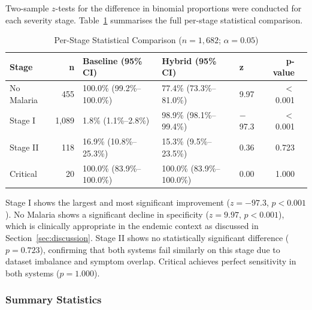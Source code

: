 \documentclass[12pt,a4paper]{article}
\begin{document}
Two-sample $z$-tests for the difference in binomial proportions were conducted for each severity stage. Table~\ref{tab:statstable} summarises the full per-stage statistical comparison.

\begin{table}[H]
\centering
\caption{Per-Stage Statistical Comparison ($n = 1{,}682$; $\alpha = 0.05$)}
\label{tab:statstable}
\begin{tabular}{@{}lrlll rp{3.5cm}@{}}
\toprule
\textbf{Stage} & \textbf{n} & \textbf{Baseline (95\% CI)} & \textbf{Hybrid (95\% CI)} & \textbf{z} & \textbf{p-value} \\
\midrule
No Malaria & 455  & 100.0\% (99.2\%--100.0\%) & 77.4\% (73.3\%--81.0\%) & 9.97  & $<$0.001 \\
Stage I    & 1,089 & 1.8\% (1.1\%--2.8\%)      & 98.9\% (98.1\%--99.4\%) & $-$97.3 & $<$0.001 \\
Stage II   & 118  & 16.9\% (10.8\%--25.3\%)   & 15.3\% (9.5\%--23.5\%)  & 0.36  & 0.723 \\
Critical   & 20   & 100.0\% (83.9\%--100.0\%) & 100.0\% (83.9\%--100.0\%) & 0.00 & 1.000 \\
\bottomrule
\end{tabular}
\end{table}

Stage I shows the largest and most significant improvement ($z = -97.3$, $p < 0.001$). No Malaria shows a significant decline in specificity ($z = 9.97$, $p < 0.001$), which is clinically appropriate in the endemic context as discussed in Section~\ref{sec:discussion}. Stage II shows no statistically significant difference ($p = 0.723$), confirming that both systems fail similarly on this stage due to dataset imbalance and symptom overlap. Critical achieves perfect sensitivity in both systems ($p = 1.000$).

\subsubsection{Summary Statistics}
\end{document}
